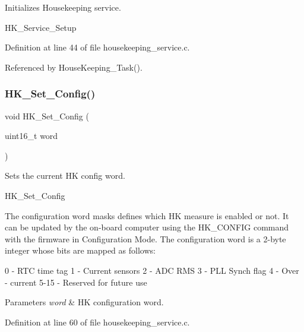 Initializes Housekeeping service. 

H\+K\+\_\+\+Service\+\_\+\+Setup 

Definition at line 44 of file housekeeping\+\_\+service.\+c.



Referenced by House\+Keeping\+\_\+\+Task().

\mbox{\label{group___h_k___service_ga4df6d95ad8240c83fae869b1cdf25c5e}} 
\subsubsection{\texorpdfstring{H\+K\+\_\+\+Set\+\_\+\+Config()}{HK\_Set\_Config()}}
{\footnotesize\ttfamily void H\+K\+\_\+\+Set\+\_\+\+Config (\begin{DoxyParamCaption}\item[{uint16\+\_\+t}]{word }\end{DoxyParamCaption})}



Sets the current HK config word. 

H\+K\+\_\+\+Set\+\_\+\+Config

The configuration word masks defines which HK measure is enabled or not. It can be updated by the on-\/board computer using the H\+K\+\_\+\+C\+O\+N\+F\+IG command with the firmware in Configuration Mode. The configuration word is a 2-\/byte integer whose bits are mapped as follows\+: 
\begin{DoxyPre}
0 - RTC time tag
1 - Current sensors
2 - ADC RMS
3 - PLL Synch flag
4 - Over - current
5-15 - Reserved for future use
\end{DoxyPre}



\begin{DoxyParams}{Parameters}
{\em word} & HK configuration word. \\
\hline
\end{DoxyParams}


Definition at line 60 of file housekeeping\+\_\+service.\+c.

\mbox{\label{group___h_k___service_gafc2f4843a1264e16569eed48653b9d5c}} 
